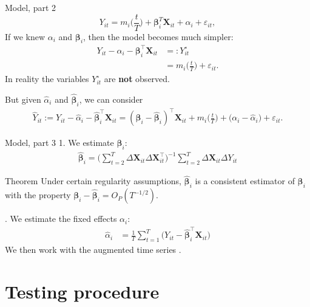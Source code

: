 \documentclass[10pt, handout]{beamer}
\newcommand{\X}{\boldsymbol{X}}
\newcommand{\bfbeta}{\boldsymbol{\beta}}
\begin{document}
\begin{frame}{Model, part 2}
\begin{equation*}
Y_{it} = m_i \Big( \frac{t}{T} \Big) + \bfbeta_i^T\X_{it}+ \alpha_i + \varepsilon_{it},
\end{equation*}\pause
If we knew $\alpha_i$ and $\bfbeta_i$, then the model becomes much simpler:
\begin{align*}
Y_{it} - \alpha_i - \bfbeta_i^\top \X_{it} & =: Y_{it}^\circ\\
					& = m_i \Big( \frac{t}{T} \Big) + \varepsilon_{it}. 
\end{align*}\pause
In reality the variables $Y_{it}^\circ$ are \textbf{not} observed. 

But given $\widehat{\alpha}_i$ and $\widehat{\bfbeta}_i$, we can consider
\begin{align*}
	\widehat{Y}_{it} := Y_{it} -\widehat{\alpha}_i - \widehat{\bfbeta}_i^\top \X_{it} =(\bfbeta_i - \widehat{\bfbeta}_i)^\top \X_{it} + m_i \Big( \frac{t}{T} \Big) + \big( \alpha_i - \widehat{\alpha}_i \big) + \varepsilon_{it}. 
\end{align*}
\end{frame}


\begin{frame}{Model, part 3}
1. We estimate $\bfbeta_i$:
\begin{align*}
\widehat{\bfbeta}_i = \Big( \sum_{t=2}^T \Delta \X_{it} \Delta \X_{it}^\top \Big)^{-1} \sum_{t=2}^T \Delta \X_{it} \Delta Y_{it}
\end{align*}\pause
\vspace{-3mm}
\begin{block}{Theorem}
Under certain regularity assumptions, $\widehat{\bfbeta}_i$ is a consistent estimator of $\bfbeta_i$ with the property $\bfbeta_i - \widehat{\bfbeta}_i = O_P(T^{-1/2})$.
\end{block}. We estimate the fixed effects $\alpha_i$:
\begin{align*}
\widehat{\alpha}_i &= \frac{1}{T}\sum_{t=1}^T \big(Y_{it} - \widehat{\bfbeta}_i^\top \X_{it}\big)
\end{align*}\pause
We then work with the augmented time series \color{mLightBrown}{$\widehat{Y}_{it} = Y_{it} - \widehat{\alpha}_i - \widehat{\bfbeta}_i^\top \X_{it}$}.
\end{frame}

\section{Testing procedure}
\end{document}
